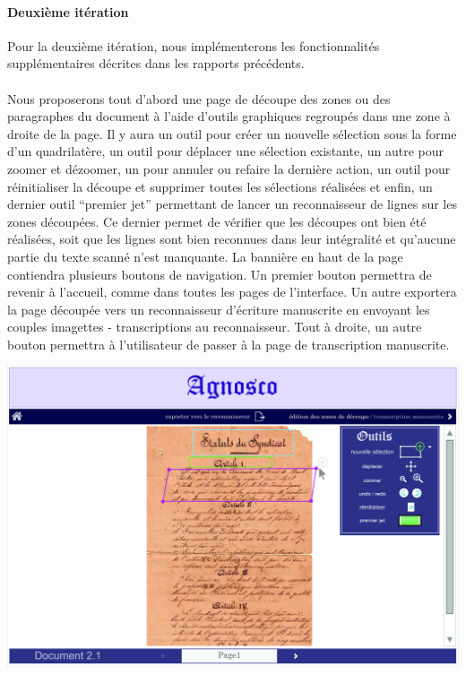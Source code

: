 \newpage{}

\paragraph{Deuxième itération}
Pour la deuxième itération, nous implémenterons les fonctionnalités supplémentaires décrites dans les rapports précédents.

\paragraph{}
Nous proposerons tout d’abord une page de découpe des zones ou des paragraphes du document à l’aide d’outils graphiques regroupés dans une zone à droite de la page. Il y aura un outil pour créer un nouvelle sélection sous la forme d’un quadrilatère, un outil pour déplacer une sélection existante, un autre pour zoomer et dézoomer, un pour annuler ou refaire la dernière action, un outil pour réinitialiser la découpe et supprimer toutes les sélections réalisées et enfin, un dernier outil “premier jet” permettant de lancer un reconnaisseur de lignes sur les zones découpées. Ce dernier permet de vérifier que les découpes ont bien été réalisées, soit que les lignes sont bien reconnues dans leur intégralité et qu'aucune partie du texte scanné n’est manquante.
\newline{}
La bannière en haut de la page contiendra plusieurs boutons de navigation. Un premier bouton permettra de revenir à l’accueil, comme dans toutes les pages de l’interface. Un autre exportera la page découpée vers un reconnaisseur d’écriture manuscrite en envoyant les couples imagettes - transcriptions au reconnaisseur. Tout à droite, un autre bouton permettra à l’utilisateur de passer à la page de transcription manuscrite.

\begin{mdframed}[frametitle={Figure 3 : Maquette de la page de découpe des zones}, innerbottommargin=10]
\begin{center}
\includegraphics[scale=0.04]{assets/maquetteIHMdecoupes.jpg}
\end{center}
\end{mdframed}

